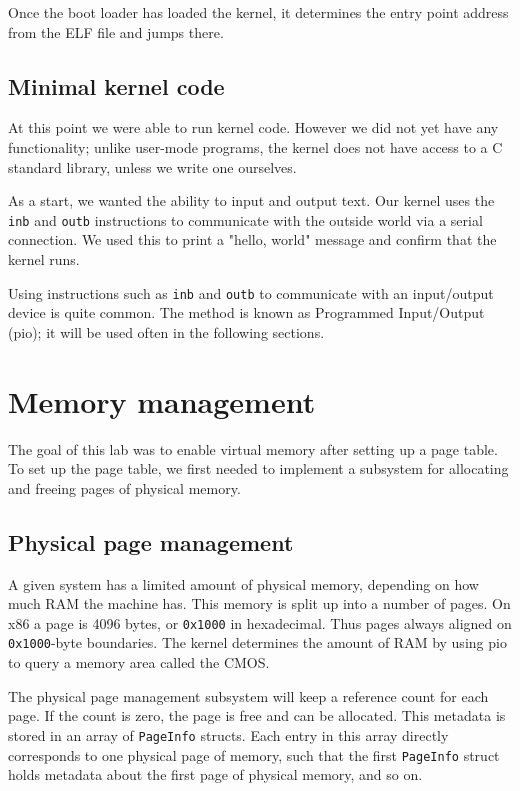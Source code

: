 \documentclass{report}
\begin{document}
Once the boot loader has loaded the kernel, it determines the entry point
address from the ELF file and jumps there.


\section{Minimal kernel code}
At this point we were able to run kernel code. However we did not yet have any
functionality; unlike user-mode programs, the kernel does not have access to a
C standard library, unless we write one ourselves.

As a start, we wanted the ability to input and output text.
Our kernel uses the \texttt{inb} and \texttt{outb} instructions to
communicate with the outside world via a serial connection. We used this to
print a "hello, world" message and confirm that the kernel runs.

Using instructions such as \texttt{inb} and \texttt{outb} to communicate with
an input/output device is quite common. The method is known as Programmed
Input/Output (\gls{pio}); it will be used often in the following sections.



\chapter{Memory management}
\label{sec:mem}
The goal of this lab was to enable virtual memory after setting up a page
table. To set up the page table, we first needed to implement a subsystem
for allocating and freeing pages of physical memory.


\section{Physical page management}
A given system has a limited amount of physical memory, depending on how much
RAM the machine has. This memory is split up into a number of pages. On x86 a
page is 4096 bytes, or \texttt{0x1000} in hexadecimal. Thus pages always aligned on
\texttt{0x1000}-byte boundaries. The kernel determines the amount of RAM by using
\gls{pio} to query a memory area called the CMOS. 

The physical page management subsystem will keep a reference count for each
page. If the count is zero, the page is free and can be allocated. This
metadata is stored in an array of \texttt{PageInfo} structs. Each entry in
this array directly corresponds to one physical page of memory, such that the
first \texttt{PageInfo} struct holds metadata about the first page of physical
memory, and so on.
\end{document}
